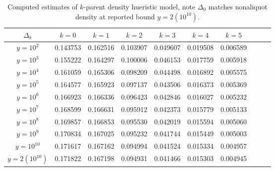 \documentclass{article}
\theoremstyle{definition}
\begin{document}
\begin{table}[H]
    \centering
    \begin{tabular}{| c | c | c | c | c | c | c | c | c | c |}
        \hline
        $\Delta_k$       & $k = 0$  & $k = 1$  & $k = 2$  & $k = 3$  & $k = 4$  & $k = 5$  \\
        \hline
        $y = 10^2$       & 0.143753 & 0.162516 & 0.103907 & 0.049607 & 0.019508 & 0.006589 \\
        $y = 10^3$       & 0.155222 & 0.164297 & 0.100006 & 0.046153 & 0.017759 & 0.005918 \\
        $y = 10^4$       & 0.161059 & 0.165306 & 0.098209 & 0.044498 & 0.016892 & 0.005575 \\
        $y = 10^5$       & 0.164577 & 0.165923 & 0.097137 & 0.043506 & 0.016373 & 0.005369 \\
        $y = 10^6$       & 0.166923 & 0.166336 & 0.096423 & 0.042846 & 0.016027 & 0.005232 \\
        $y = 10^7$       & 0.168599 & 0.166631 & 0.095912 & 0.042373 & 0.015779 & 0.005133 \\
        $y = 10^8$       & 0.169857 & 0.166853 & 0.095530 & 0.042019 & 0.015594 & 0.005060 \\
        $y = 10^9$       & 0.170834 & 0.167025 & 0.095232 & 0.041744 & 0.015449 & 0.005003 \\
        $y = 10^{10}$    & 0.171617 & 0.167162 & 0.094994 & 0.041524 & 0.015334 & 0.004957 \\
        $y = 2(10^{10})$ & 0.171822 & 0.167198 & 0.094931 & 0.041466 & 0.015303 & 0.004945 \\
        \hline
    \end{tabular}
    \caption{Computed estimates of $k$-parent density hueristic model, note $\Delta_0$ matches \cite{pollPom} nonaliquot density at reported bound $y = 2(10^{10})$.}
    \label{tab:pomyang_kparent}
\end{table}
\end{document}
